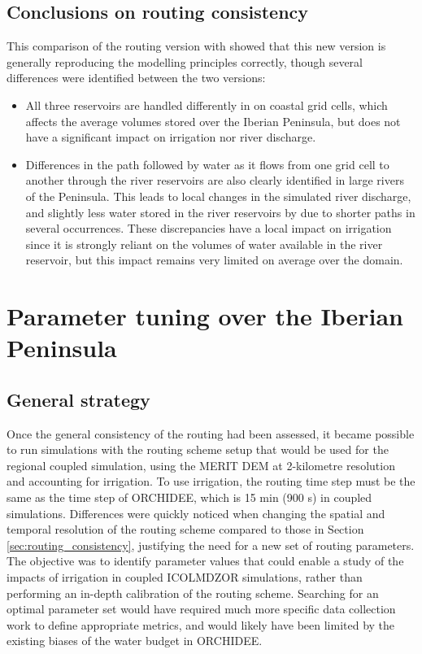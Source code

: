 \subsection{Conclusions on \native routing consistency}
This comparison of the \native routing version with \std showed that this new version is generally reproducing the modelling principles correctly, though several differences were identified between the two versions:
\begin{itemize}
    \item All three reservoirs are handled differently in \native on coastal grid cells, which affects the average volumes stored over the Iberian Peninsula, but does not have a significant impact on irrigation nor river discharge. 
    \item Differences in the path followed by water as it flows from one grid cell to another through the river reservoirs are also clearly identified in large rivers of the Peninsula. This leads to local changes in the simulated river discharge, and slightly less water stored in the river reservoirs by \native due to shorter paths in several occurrences. These discrepancies have a local impact on irrigation since it is strongly reliant on the volumes of water available in the river reservoir, but this impact remains very limited on average over the domain.
\end{itemize}

\section{Parameter tuning over the Iberian Peninsula}
\label{section:calib}

\subsection{General strategy}

Once the general consistency of the \native routing had been assessed, it became possible to run simulations with the routing scheme setup that would be used for the regional coupled simulation, using the MERIT DEM at 2-kilometre resolution and accounting for irrigation. To use irrigation, the routing time step must be the same as the time step of ORCHIDEE, which is 15 min (900 s) in coupled simulations. 
Differences were quickly noticed when changing the spatial and temporal resolution of the routing scheme compared to those in Section \ref{sec:routing_consistency}, justifying the need for a new set of routing parameters. The objective was to identify parameter values that could enable a study of the impacts of irrigation in coupled ICOLMDZOR simulations, rather than performing an in-depth calibration of the routing scheme. Searching for an optimal parameter set would have required much more specific data collection work to define appropriate metrics, and would likely have been limited by the existing biases of the water budget in ORCHIDEE. 

